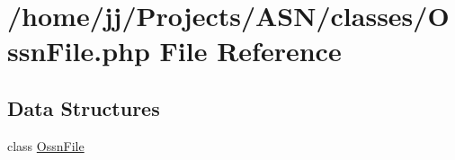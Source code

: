 \hypertarget{_ossn_file_8php}{}\section{/home/jj/\+Projects/\+A\+S\+N/classes/\+Ossn\+File.php File Reference}
\label{_ossn_file_8php}
\subsection*{Data Structures}
\begin{DoxyCompactItemize}
\item 
class \hyperlink{class_ossn_file}{Ossn\+File}
\end{DoxyCompactItemize}
